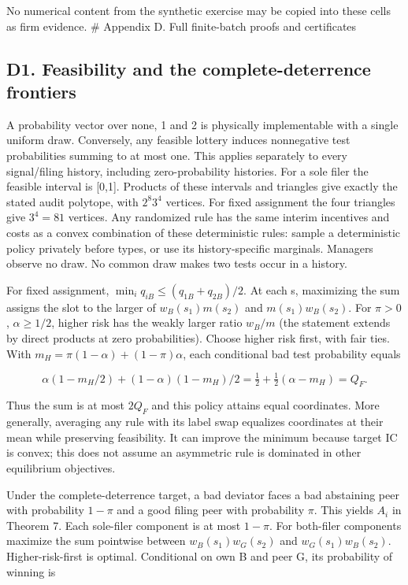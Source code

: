 \documentclass[
  11pt,
]{article}
\begin{document}
No numerical content from the synthetic exercise may be copied into
these cells as firm evidence. \# Appendix D. Full finite-batch proofs
and certificates

\subsection{D1. Feasibility and the complete-deterrence
frontiers}\label{d1.-feasibility-and-the-complete-deterrence-frontiers}

A probability vector over none, 1 and 2 is physically implementable with
a single uniform draw. Conversely, any feasible lottery induces
nonnegative test probabilities summing to at most one. This applies
separately to every signal/filing history, including zero-probability
histories. For a sole filer the feasible interval is {[}0,1{]}. Products
of these intervals and triangles give exactly the stated audit polytope,
with \(2^8 3^4\) vertices. For fixed assignment the four triangles give
\(3^4=81\) vertices. Any randomized rule has the same interim incentives
and costs as a convex combination of these deterministic rules: sample a
deterministic policy privately before types, or use its history-specific
marginals. Managers observe no draw. No common draw makes two tests
occur in a history.

For fixed assignment, \(\min_i q_{iB}\leq(q_{1B}+q_{2B})/2\). At each s,
maximizing the sum assigns the slot to the larger of \(w_B(s_1)m(s_2)\)
and \(m(s_1)w_B(s_2)\). For \(\pi>0\), \(\alpha\geq1/2\), higher risk
has the weakly larger ratio \(w_B/m\) (the statement extends by direct
products at zero probabilities). Choose higher risk first, with fair
ties. With \(m_H=\pi(1-\alpha)+(1-\pi)\alpha\), each conditional bad
test probability equals

\[\alpha(1-m_H/2)+(1-\alpha)(1-m_H)/2
=\tfrac12+\tfrac12(\alpha-m_H)=Q_F.\]

Thus the sum is at most \(2Q_F\) and this policy attains equal
coordinates. More generally, averaging any rule with its label swap
equalizes coordinates at their mean while preserving feasibility. It can
improve the minimum because target IC is convex; this does not assume an
asymmetric rule is dominated in other equilibrium objectives.

Under the complete-deterrence target, a bad deviator faces a bad
abstaining peer with probability \(1-\pi\) and a good filing peer with
probability \(\pi\). This yields \(A_i\) in Theorem 7. Each sole-filer
component is at most \(1-\pi\). For both-filer components maximize the
sum pointwise between \(w_B(s_1)w_G(s_2)\) and \(w_G(s_1)w_B(s_2)\).
Higher-risk-first is optimal. Conditional on own B and peer G, its
probability of winning is
\end{document}

